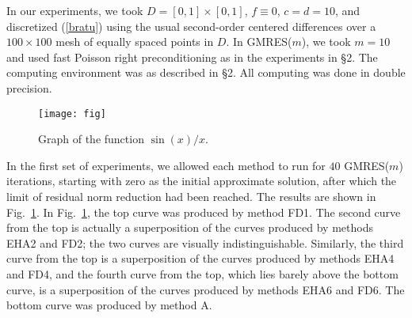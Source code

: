 \documentclass[slovensky]{svk}
\begin{document}
\def\gmres{{GMRES}} 
\def\gmresm{{\rm GMRES($m$)}} 

In our experiments, we took $D = [0,1]\times[0,1]$, $f \equiv0$, 
$c=d=10$, and discretized (\ref{bratu}) using the usual second-order 
centered differences over a $100\times100$ mesh of equally 
spaced points in $D$. In \gmres($m$), we took $m=10$ and used fast  
Poisson right preconditioning as in the experiments in \S2. The computing  
environment was as described in \S2. All computing was done  
in double precision.  
 
\begin{figure}
\texttt{[image: fig]}
\caption{Graph of the function $\sin(x)/x$.} 
\label{diff} 
\end{figure}  
 
In the first set of experiments, we allowed each method to  
run for $40$ {\gmresm} iterations, starting with zero as the initial  
approximate solution, after which the limit of residual norm  
reduction had been reached. The results are shown in Fig.~\ref{diff}.  
In Fig.~\ref{diff}, the top curve was produced by method FD1. 
The second curve from the top is actually a superposition of  
the curves produced by methods EHA2 and FD2; the two curves are 
visually indistinguishable. Similarly, the third curve from  
the top is a superposition of the curves produced by methods EHA4 
and FD4, and the fourth curve from the top, which lies barely above  
the bottom curve, is a superposition of the curves produced by  
methods EHA6 and FD6. The bottom curve was produced by method A. 
 
\end{document}
